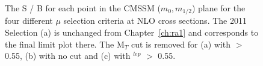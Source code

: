 \begin{figure}[htbp]
\centering
{}
\caption{\label{fig:4fit}The S / B for each point in the CMSSM ($m_{0},m_{1/2}$) plane for the four different $\mu$ selection criteria at NLO cross sections. The 2011 Selection (a) is unchanged from Chapter~\ref{ch:ra1} and corresponds to the final limit plot there. The M$_{T}$ cut is removed for (a) with \alt $>$ 0.55, (b) with no \alt cut and (c) with \alt$^{lep}$ $>$ 0.55.}
\end{figure}





